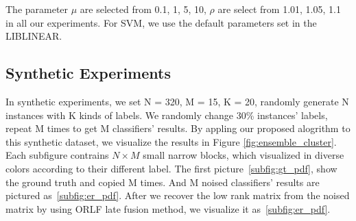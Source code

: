 \documentclass[letterpaper]{article}
\begin{document}
The parameter $\mu$ are selected from {0.1, 1, 5, 10}, $\rho$ are select from {1.01, 1.05, 1.1} in all our experiments. For SVM, we use the default parameters set in the LIBLINEAR.

\subsection{Synthetic Experiments}

In synthetic experiments, we set N = 320, M = 15, K = 20, randomly generate N instances with K kinds of labels. We randomly change 30\% instances' labels, repeat M times to get M classifiers' results. By appling our proposed alogrithm to this synthetic dataset, we visualize the results in Figure \ref{fig:ensemble_cluster}. Each subfigure contrains $N\times M$ small narrow blocks, which visualized in diverse colors according to their different label. The first picture~\ref{subfig:gt_pdf}, show the ground truth and copied M times. And M noised classifiers' results are pictured as~\ref{subfig:er_pdf}. After we recover the low rank matrix from the noised matrix by using ORLF late fusion method, we visualize it as~\ref{subfig:er_pdf}.
\end{document}
